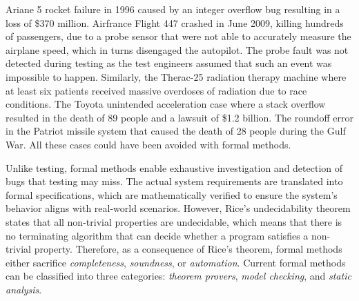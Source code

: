 Ariane 5 rocket failure in 1996 caused by an integer overflow bug resulting in a loss of \$370 million.
Airfrance Flight 447 crashed in June 2009, killing hundreds of passengers, due to a probe sensor that were not able to accurately measure the airplane speed, which in turns disengaged the autopilot. The probe fault was not detected during testing as the test engineers assumed that such an event was impossible to happen.
Similarly, the Therac-25 radiation therapy machine where at least six patients received massive overdoses of radiation due to race conditions.
The Toyota unintended acceleration case where a stack overflow resulted in the death of 89 people and a lawsuit of \$1.2 billion.
The roundoff error in the Patriot missile system that caused the death of 28 people during the Gulf War.
All these cases could have been avoided with formal methods.

Unlike testing, formal methods enable exhaustive investigation and detection of bugs that testing may miss. The actual system requirements are translated into formal specifications, which are mathematically verified to ensure the system's behavior aligns with real-world scenarios.
However, Rice's undecidability theorem  states that all non-trivial properties are undecidable, which means that there is no terminating algorithm that can decide whether a program satisfies a non-trivial property.
Therefore, as a consequence of Rice's theorem, formal methods either sacrifice \emph{completeness}, \emph{soundness}, or \emph{automation}.
Current formal methods can be classified into three categories: \emph{theorem provers}, \emph{model checking}, and \emph{static analysis}.



